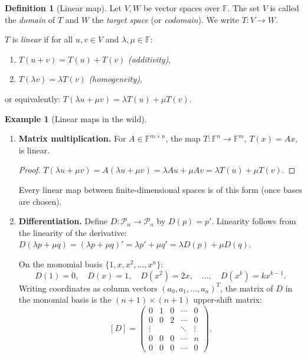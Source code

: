 \documentclass[11pt]{article}
\theoremstyle{definition}
\newtheorem{definition}{Definition}[section]
\newtheorem{example}{Example}[section]
\theoremstyle{plain}
\begin{document}
\begin{definition}[Linear map]
  Let $V,W$ be vector spaces over $\mathbb{F}$.  The set $V$ is called the
  \emph{domain} of $T$ and $W$ the \emph{target space} (or \emph{codomain}).
  We write $T:V\to W$.

  $T$ is \emph{linear} if for all $u,v\in V$ and $\lambda,\mu\in\mathbb{F}$:
  \begin{enumerate}
    \item $T(u+v) = T(u)+T(v)$ \quad\textit{(additivity)},
    \item $T(\lambda v) = \lambda T(v)$ \quad\textit{(homogeneity)},
  \end{enumerate}
  or equivalently: $T(\lambda u + \mu v) = \lambda T(u) + \mu T(v)$.
\end{definition}

\begin{example}[Linear maps in the wild]
  \leavevmode
  \begin{enumerate}
    \item \textbf{Matrix multiplication.}  For $A\in\mathbb{F}^{m\times n}$,
      the map $T:\mathbb{F}^n\to\mathbb{F}^m$, $T(x) = Ax$, is linear.
      \begin{proof}
        $T(\lambda u+\mu v)=A(\lambda u+\mu v)=\lambda Au+\mu Av
        =\lambda T(u)+\mu T(v)$.
      \end{proof}
      Every linear map between finite-dimensional spaces is of this form
      (once bases are chosen).

    \item \textbf{Differentiation.}  Define $D:\mathcal{P}_n\to\mathcal{P}_n$
      by $D(p) = p'$.  Linearity follows from the linearity of the derivative:
      $D(\lambda p+\mu q)=(\lambda p+\mu q)'=\lambda p'+\mu q'
      =\lambda D(p)+\mu D(q)$.

      On the monomial basis $\{1, x, x^2,\ldots,x^n\}$:
      \[
        D(1)=0,\quad D(x)=1,\quad D(x^2)=2x,\quad\ldots,\quad D(x^k)=kx^{k-1}.
      \]
      Writing coordinates as column vectors $(a_0,a_1,\ldots,a_n)^T$,
      the matrix of $D$ in the monomial basis is the $(n+1)\times(n+1)$
      upper-shift matrix:
      \[
        [D] = \begin{pmatrix}
          0 & 1 & 0 & \cdots & 0 \\
          0 & 0 & 2 & \cdots & 0 \\
          \vdots & & & \ddots & \vdots \\
          0 & 0 & 0 & \cdots & n \\
          0 & 0 & 0 & \cdots & 0
        \end{pmatrix}.
      \]


\end{enumerate}
\end{example}
\end{document}
